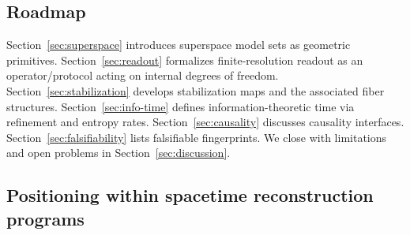 \subsection{Roadmap}

Section~\ref{sec:superspace} introduces superspace model sets as geometric primitives. Section~\ref{sec:readout} formalizes finite-resolution readout as an operator/protocol acting on internal degrees of freedom. Section~\ref{sec:stabilization} develops stabilization maps and the associated fiber structures. Section~\ref{sec:info-time} defines information-theoretic time via refinement and entropy rates. Section~\ref{sec:causality} discusses causality interfaces. Section~\ref{sec:falsifiability} lists falsifiable fingerprints. We close with limitations and open problems in Section~\ref{sec:discussion}.

\subsection{Positioning within spacetime reconstruction programs}\label{sec:intro:positioning}

